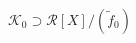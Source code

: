 \documentclass[preview]{standalone}
\begin{document}
\begin{center}
$ \mathcal{K}_0 \supset \mathcal{R}[X]/(\tilde{f}_0)$
\end{center}
\end{document}
